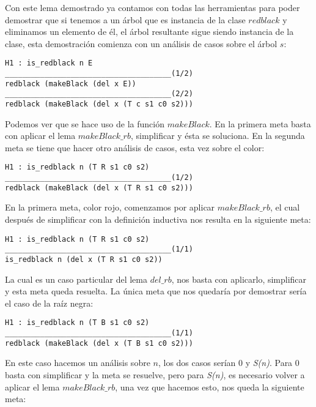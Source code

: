 Con este lema demostrado ya contamos con todas las herramientas para poder 
demostrar que si tenemos a 
un \'arbol que es instancia de la clase \hyperref[class_rb]{$redblack$} y eliminamos un elemento de 
\'el, el \'arbol resultante sigue siendo instancia de la clase, esta 
demostraci\'on comienza con un análisis de casos 
sobre el \'arbol $s$:

\begin{verbatim}
H1 : is_redblack n E
______________________________________(1/2)
redblack (makeBlack (del x E))
______________________________________(2/2)
redblack (makeBlack (del x (T c s1 c0 s2)))
\end{verbatim}

Podemos ver que se hace uso de la funci\'on \hyperref[raiz_negra_func]{$makeBlack$}. En la primera 
meta basta con aplicar el lema $makeBlack\_rb$, simplificar y \'esta se soluciona. En la segunda meta 
se tiene que hacer otro an\'alisis de casos, esta vez sobre el color:

\begin{verbatim}
H1 : is_redblack n (T R s1 c0 s2)
______________________________________(1/2)
redblack (makeBlack (del x (T R s1 c0 s2)))

\end{verbatim}

En la primera meta, color rojo, comenzamos por aplicar $makeBlack\_rb$, el cual despu\'es de
simplificar con la definici\'on inductiva nos resulta en la siguiente meta:

\begin{verbatim}
H1 : is_redblack n (T R s1 c0 s2)
______________________________________(1/1)
is_redblack n (del x (T R s1 c0 s2))
\end{verbatim}

La cual es un caso particular del lema \hyperref[lema_6]{$del\_rb$}, nos basta con aplicarlo, 
simplificar y esta meta queda resuelta. La \'unica meta que nos quedaría por demostrar ser\'ia el caso 
de la raíz negra:

\begin{verbatim}
H1 : is_redblack n (T B s1 c0 s2)
______________________________________(1/1)
redblack (makeBlack (del x (T B s1 c0 s2)))
\end{verbatim}

En este caso hacemos un análisis sobre $n$, los dos casos ser\'ian 0 y \textit{S(n)}. Para 0 basta
con simplificar y la meta se resuelve, pero para \textit{S(n)}, es necesario volver a aplicar el
lema $makeBlack\_rb$, una vez que hacemos esto, nos queda la siguiente meta:

